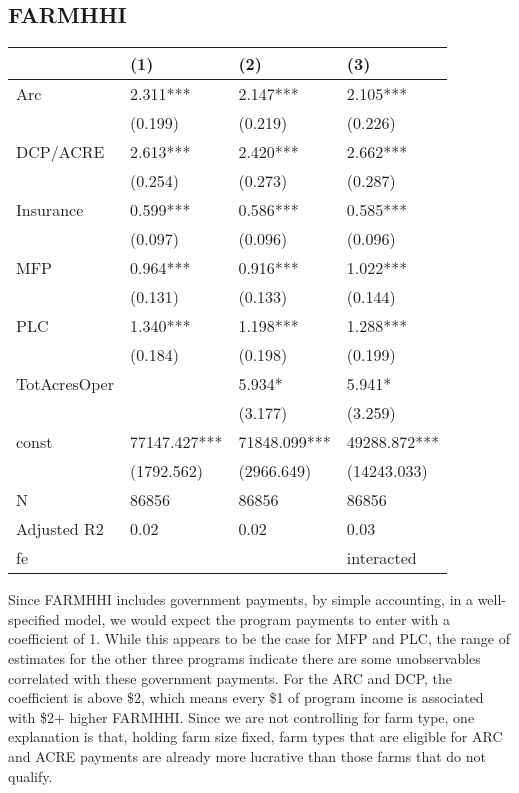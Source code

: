 \documentclass[11pt]{article}
\begin{document}
\subsection{FARMHHI}
\label{sec:orgc37b6ef}
\begin{center}
\begin{tabular}{llll}
\hline
 & (1) & (2) & (3)\\[0pt]
\hline
Arc & 2.311*** & 2.147*** & 2.105***\\[0pt]
 & (0.199) & (0.219) & (0.226)\\[0pt]
DCP/ACRE & 2.613*** & 2.420*** & 2.662***\\[0pt]
 & (0.254) & (0.273) & (0.287)\\[0pt]
Insurance & 0.599*** & 0.586*** & 0.585***\\[0pt]
 & (0.097) & (0.096) & (0.096)\\[0pt]
MFP & 0.964*** & 0.916*** & 1.022***\\[0pt]
 & (0.131) & (0.133) & (0.144)\\[0pt]
PLC & 1.340*** & 1.198*** & 1.288***\\[0pt]
 & (0.184) & (0.198) & (0.199)\\[0pt]
TotAcresOper &  & 5.934* & 5.941*\\[0pt]
 &  & (3.177) & (3.259)\\[0pt]
const & 77147.427*** & 71848.099*** & 49288.872***\\[0pt]
 & (1792.562) & (2966.649) & (14243.033)\\[0pt]
N & 86856 & 86856 & 86856\\[0pt]
Adjusted R2 & 0.02 & 0.02 & 0.03\\[0pt]
fe &  &  & interacted\\[0pt]
\end{tabular}
\end{center}

Since FARMHHI includes government payments, by simple accounting, in a well-specified model, we would expect the program payments to enter with a coefficient of 1. While this appears to be the case for MFP and PLC, the range of estimates for the other three programs indicate there are some unobservables correlated with these government payments. For the ARC and DCP, the coefficient is above \$2, which means every \$1 of program income is associated with \$2+ higher FARMHHI. Since we are not controlling for farm type, one explanation is that, holding farm size fixed, farm types that are eligible for ARC and ACRE payments are already more lucrative than those farms that do not qualify.
\end{document}
